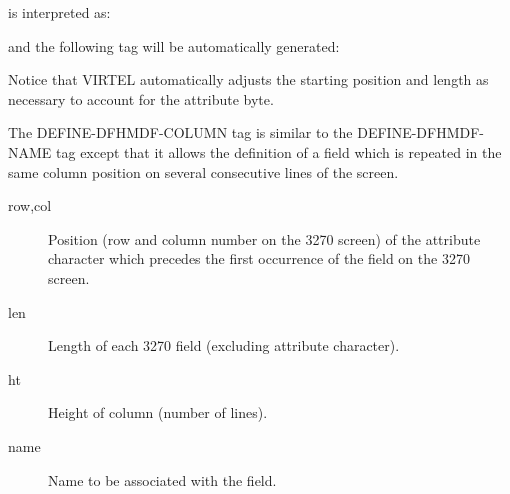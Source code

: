 \documentclass[letterpaper,10pt,english]{sphinxmanual}
\begin{document}
is interpreted as:

\begin{sphinxVerbatim}[commandchars=\\\{\}]
   
\end{sphinxVerbatim}

and the following tag will be automatically generated:

\begin{sphinxVerbatim}[commandchars=\\\{\}]
    
\end{sphinxVerbatim}

Notice that VIRTEL automatically adjusts the starting position and length as necessary to account for the attribute byte.
\label{\detokenize{User_Guide:v457ug-define-dfhmdf-column}}

The DEFINE-DFHMDF-COLUMN tag is similar to the DEFINE-DFHMDF-NAME tag except that it allows the definition of a field which is repeated in the same column position on several consecutive lines of the screen.

\begin{sphinxVerbatim}[commandchars=\\\{\}]
      
\end{sphinxVerbatim}
\begin{description}
\item[{row,col}] \leavevmode
Position (row and column number on the 3270 screen) of the attribute character which precedes the first occurrence of the field on the 3270 screen.

\item[{len}] \leavevmode
Length of each 3270 field (excluding attribute character).

\item[{ht}] \leavevmode
Height of column (number of lines).

\item[{name}] \leavevmode
Name to be associated with the field.

\end{description}
\end{document}
